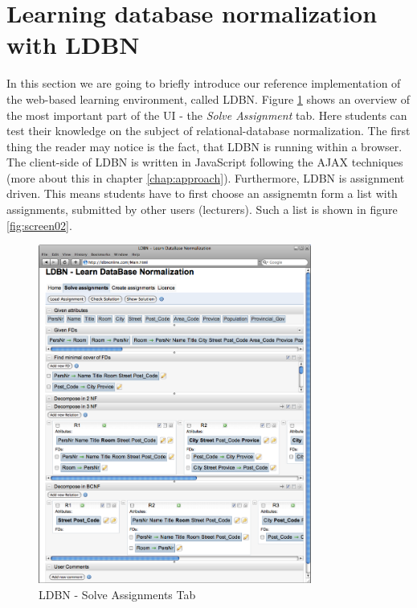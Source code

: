 \section{Learning database normalization with LDBN}
\label{sec:introldbn}
In this section we are going to briefly introduce our reference implementation
of the web-based learning environment, called LDBN.    
Figure \ref{fig:screen01} shows an overview of the most important part of the UI - 
the \textit{Solve Assignment} tab. Here students can test their knowledge on 
the subject of relational-database normalization. The first thing the reader 
may notice is the fact, that LDBN is running within a browser. The client-side 
of LDBN is written in JavaScript following the AJAX techniques 
(more about this in chapter \ref{chap:approach}). 
Furthermore, LDBN is assignment driven. This means students have to first 
choose an assignemtn 
form a list with assignments, submitted by other users (lecturers). 
Such a list is shown in figure \ref{fig:screen02}.

\begin{figure}[h]
	\begin{center}
		\includegraphics[width=0.8\textwidth]{./img/screen01b.png}
		\caption{LDBN - Solve Assignments Tab}
		\label{fig:screen01}
	\end{center}
\end{figure}

